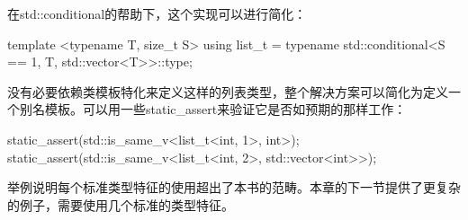 在std::conditional的帮助下，这个实现可以进行简化：

\begin{cppcode}
template <typename T, size_t S>
using list_t =
	typename std::conditional<S ==
					1, T, std::vector<T>>::type;
\end{cppcode}

没有必要依赖类模板特化来定义这样的列表类型，整个解决方案可以简化为定义一个别名模板。可以用一些static_assert来验证它是否如预期的那样工作：

\begin{cppcode}
static_assert(std::is_same_v<list_t<int, 1>, int>);
static_assert(std::is_same_v<list_t<int, 2>,
							std::vector<int>>);
\end{cppcode}

举例说明每个标准类型特征的使用超出了本书的范畴。本章的下一节提供了更复杂的例子，需要使用几个标准的类型特征。